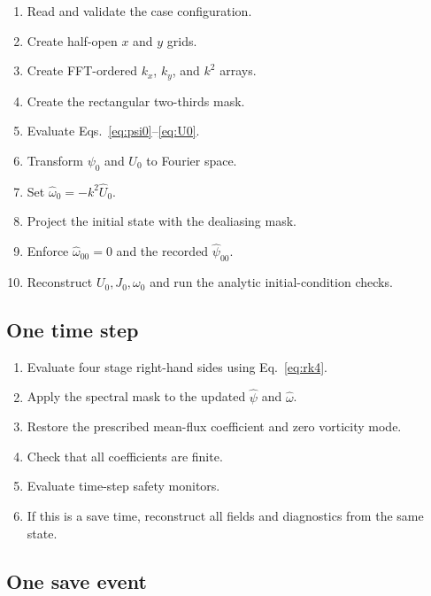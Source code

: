 \documentclass[11pt]{article}
\begin{document}
\begin{enumerate}[label=\arabic*.]
  \item Read and validate the case configuration.
  \item Create half-open $x$ and $y$ grids.
  \item Create FFT-ordered $k_x$, $k_y$, and $k^2$ arrays.
  \item Create the rectangular two-thirds mask.
  \item Evaluate Eqs.~\eqref{eq:psi0}--\eqref{eq:U0}.
  \item Transform $\psi_0$ and $U_0$ to Fourier space.
  \item Set $\widehat\omega_0=-k^2\widehat U_0$.
  \item Project the initial state with the dealiasing mask.
  \item Enforce $\widehat\omega_{00}=0$ and the recorded $\widehat\psi_{00}$.
  \item Reconstruct $U_0,J_0,\omega_0$ and run the analytic initial-condition checks.
\end{enumerate}

\subsection{One time step}

\begin{enumerate}[label=\arabic*.]
  \item Evaluate four stage right-hand sides using Eq.~\eqref{eq:rk4}.
  \item Apply the spectral mask to the updated $\widehat\psi$ and $\widehat\omega$.
  \item Restore the prescribed mean-flux coefficient and zero vorticity mode.
  \item Check that all coefficients are finite.
  \item Evaluate time-step safety monitors.
  \item If this is a save time, reconstruct all fields and diagnostics from the same state.
\end{enumerate}

\subsection{One save event}
\end{document}
